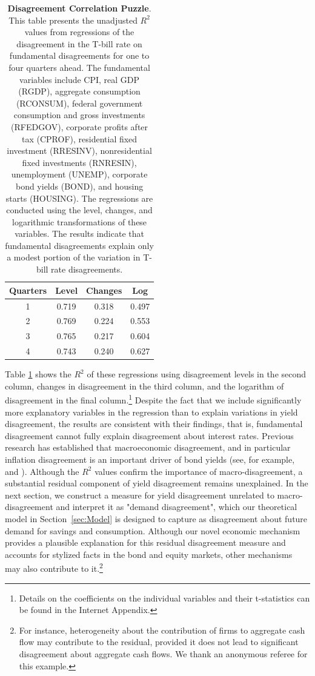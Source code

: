 \documentclass[preprint,11pt,authoryear]{elsarticle}
\theoremstyle{plain}
\begin{document}
\begin{table}[htbp]
\centering
\begin{tabular}{cccc}
\toprule
Quarters &  Level & Changes &  Log \\
\midrule
1 &  0.719 &  0.318 &  0.497 \\
2 &  0.769 &  0.224 &  0.553 \\
3 &  0.765 &  0.217 &  0.604 \\
4 &  0.743 &  0.240 &  0.627 \\
\bottomrule
\end{tabular}
\caption{{\bf Disagreement Correlation Puzzle}. This table presents the unadjusted $R^2$ values from regressions of the disagreement in the T-bill rate on fundamental disagreements for one to four quarters ahead. The fundamental variables include CPI, real GDP (RGDP), aggregate consumption (RCONSUM), federal government consumption and gross investments (RFEDGOV), corporate profits after tax (CPROF), residential fixed investment (RRESINV), nonresidential fixed investments (RNRESIN), unemployment (UNEMP), corporate bond yields (BOND), and housing starts (HOUSING). The regressions are conducted using the level, changes, and logarithmic transformations of these variables. The results indicate that fundamental disagreements explain only a modest portion of the variation in T-bill rate disagreements.}
\label{tab:spanningregressions}
\end{table}
 

Table \ref{tab:spanningregressions} shows the $R^2$ of these regressions using disagreement levels in the second column, changes in disagreement in the third column, and the logarithm of disagreement in the final column.\footnote{Details on the coefficients on the individual variables and their t-statistics can be found in the Internet Appendix.} Despite the fact that we include significantly more explanatory variables in the regression than \cite{GiacolettiLaursenSingleton2021} to explain variations in yield disagreement, the results are consistent with their findings, that is, fundamental disagreement cannot fully explain disagreement about interest rates. Previous research has established that macroeconomic disagreement, and in particular inflation disagreement is an important driver of bond yields (see, for example, \cite{xiong-yan-2010} and \cite{EGHI2017}). Although the $R^2$ values confirm the importance of macro-disagreement, a substantial residual component of yield disagreement remains unexplained. In the next section, we construct a measure for yield disagreement unrelated to macro-disagreement and interpret it as "demand disagreement", which our theoretical model in Section~\ref{sec:Model} is designed to capture as disagreement about future demand for savings and consumption. Although our novel economic mechanism provides a plausible explanation for this residual disagreement measure and accounts for stylized facts in the bond and equity markets, other mechanisms may also contribute to it.\footnote{For instance, heterogeneity about the contribution of firms to aggregate cash flow may contribute to the residual, provided it does not lead to significant disagreement about aggregate cash flows. We thank an anonymous referee for this example.}
\end{document}
